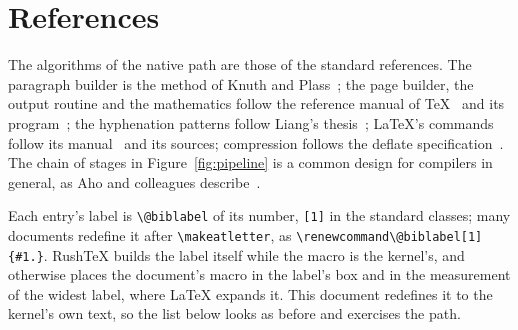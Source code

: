 \documentclass{article}
\numberwithin{equation}{section}
\theoremstyle{definition}
\theoremstyle{remark}
\begin{document}
\section{References}\label{sec:bib}

The algorithms of the native path are those of the standard references. The paragraph
builder is the method of Knuth and Plass~\cite{knuth81}; the page builder, the output
routine and the mathematics follow the reference manual of \TeX~\cite{knuth86} and its
program~\cite{knuth86b}; the hyphenation patterns follow Liang's thesis~\cite{liang83};
\LaTeX's commands follow its manual~\cite{lamport94} and its sources; compression
follows the deflate specification~\cite{deutsch96}. The chain of stages in
Figure~\ref{fig:pipeline} is a common design for compilers in general, as Aho and
colleagues describe~\cite{aho06}.

Each entry's label is \verb|\@biblabel| of its number, \texttt{[1]} in the standard
classes; many documents redefine it after \verb|\makeatletter|, as
\verb|\renewcommand\@biblabel[1]{#1.}|. RushTeX builds the label itself while the macro
is the kernel's, and otherwise places the document's macro in the label's box and in
the measurement of the widest label, where \LaTeX{} expands it. This document redefines
it to the kernel's own text, so the list below looks as before and exercises the path.

\makeatletter
\renewcommand\@biblabel[1]{[#1]}
\makeatother


\end{document}
